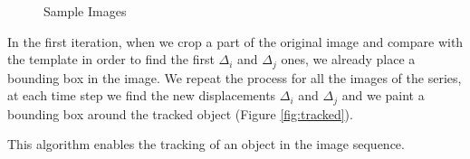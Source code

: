 \documentclass{article}
\begin{document}
\begin{figure}[H]
\centering
{}
		  \hspace{0.1cm}
		  \hspace{0.1cm}
\caption{Sample Images}
\label{fig:sample}
\end{figure}	

	In the first iteration, when we crop a part of the original image and compare with the template in order to find the first $\Delta_i$ and $\Delta_j$ ones, we already place a bounding box in the image. We repeat the process for all the images of the series, at each time step we find the new displacements $\Delta_i$ and $\Delta_j$ and we paint a bounding box around the tracked object (Figure \ref{fig:tracked}). 

	This algorithm enables the tracking of an object in the image sequence.
\end{document}
